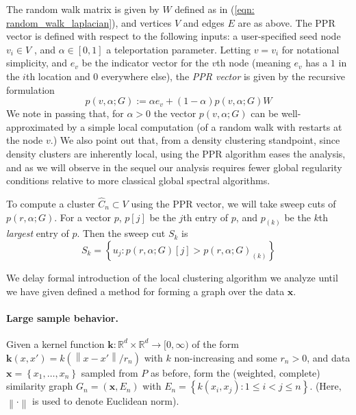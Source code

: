 \documentclass{article}
\newcommand{\set}[1]{\left\{#1\right\}}
\newcommand{\Reals}{\mathbb{R}}
\newcommand{\Rd}{\Reals^d}
\newcommand{\norm}[1]{\left\lVert#1\right\rVert}
\newcommand{\x}{\mathbf{x}}
\newcommand{\1}{\mathbf{1}}
\theoremstyle{aldenthm}
\theoremstyle{remark}
\begin{document}
The random walk matrix is given by $W$ defined as in (\ref{eqn: random_walk_laplacian}), and vertices $V$ and edges $E$ are as above. The PPR vector is defined with respect to the following inputs: a user-specified seed node $v_i \in V$ , and  $\alpha \in [0,1]$ a teleportation parameter. Letting $v = v_i$ for notational simplicity, and $e_{v}$ be the indicator vector for the $v$th node (meaning $e_v$ has a $1$ in the $i$th location and $0$ everywhere else), the \textit{PPR vector} is given by the recursive formulation
\begin{equation}
\label{eqn: ppr_vector}
p(v,\alpha;G) := \alpha e_v + (1 - \alpha) p(v,\alpha;G) W
\end{equation}
We note in passing that, for $\alpha > 0$ the vector $p(v,\alpha;G)$ can be well-approximated by a simple local computation (of a random walk with restarts at the node $v$.) We also point out that, from a density clustering standpoint, since density clusters are inherently local, using the PPR algorithm eases the analysis, and as we will observe in the sequel our analysis requires fewer global regularity conditions relative to more classical global spectral algorithms. 

To compute a cluster $\widehat{C}_n \subset V$ using the PPR vector, we will take sweep cuts of $p(r, \alpha; G)$. For a vector $p$, $p[j]$ be the $j$th entry of $p$, and $p_{(k)}$ be the $k$th \textit{largest} entry of $p$. Then the sweep cut $S_k$ is
\begin{equation}
\label{eqn: sweep_cuts}
S_k = \set{u_j: p(r, \alpha; G)[j] > p(r, \alpha; G)_{(k)}}
\end{equation}

We delay formal introduction of the local clustering algorithm we analyze until we have given defined a method for forming a graph over the data $\x$.

\paragraph{Large sample behavior.}

Given a kernel function $\mathbf{k}: \Rd \times \Rd \to [0,\infty)$ of the form $\mathbf{k}(x,x') = k(\norm{x - x'}/ r_n)$ with $k$ non-increasing and some $r_n > 0$, and data $\x = \set{x_1, \ldots, x_n}$ sampled from $P$ as before, form the (weighted, complete) similarity graph $G_n = (\x, E_n)$ with $E_n = \set{k(x_i,x_j): 1 \leq i < j \leq n}$. (Here, $\norm{\cdot}$ is used to denote Euclidean norm). 
\end{document}
